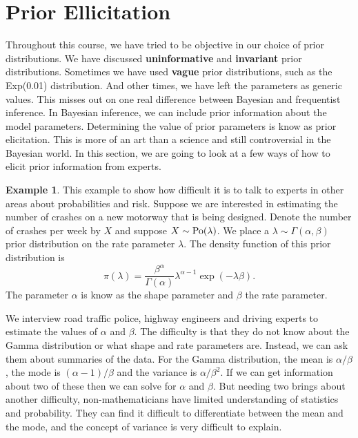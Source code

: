\documentclass[
]{book}
\theoremstyle{definition}
\theoremstyle{definition}
\newtheorem{example}{Example}[chapter]
\theoremstyle{definition}
\theoremstyle{definition}
\theoremstyle{remark}
\begin{document}
\hypertarget{prior-ellicitation}{%
\section{Prior Ellicitation}\label{prior-ellicitation}}

Throughout this course, we have tried to be objective in our choice of prior distributions. We have discussed \textbf{uninformative} and \textbf{invariant} prior distributions. Sometimes we have used \textbf{vague} prior distributions, such as the Exp(0.01) distribution. And other times, we have left the parameters as generic values. This misses out on one real difference between Bayesian and frequentist inference. In Bayesian inference, we can include prior information about the model parameters. Determining the value of prior parameters is know as prior elicitation. This is more of an art than a science and still controversial in the Bayesian world. In this section, we are going to look at a few ways of how to elicit prior information from experts.

\begin{example}
This example to show how difficult it is to talk to experts in other areas about probabilities and risk. Suppose we are interested in estimating the number of crashes on a new motorway that is being designed. Denote the number of crashes per week by \(X\) and suppose \(X \sim \hbox{Po}(\lambda)\). We place a \(\lambda \sim \Gamma(\alpha, \beta)\) prior distribution on the rate parameter \(\lambda\). The density function of this prior distribution is
\[
\pi(\lambda) = \frac{\beta^\alpha}{\Gamma(\alpha)}\lambda^{\alpha-1}\exp(-\lambda\beta). 
\]
The parameter \(\alpha\) is know as the shape parameter and \(\beta\) the rate parameter.

We interview road traffic police, highway engineers and driving experts to estimate the values of \(\alpha\) and \(\beta\). The difficulty is that they do not know about the Gamma distribution or what shape and rate parameters are. Instead, we can ask them about summaries of the data. For the Gamma distribution, the mean is \(\alpha/\beta\), the mode is \((\alpha - 1)/\beta\) and the variance is \(\alpha/\beta^2\). If we can get information about two of these then we can solve for \(\alpha\) and \(\beta\). But needing two brings about another difficulty, non-mathematicians have limited understanding of statistics and probability. They can find it difficult to differentiate between the mean and the mode, and the concept of variance is very difficult to explain.
\end{example}
\end{document}
